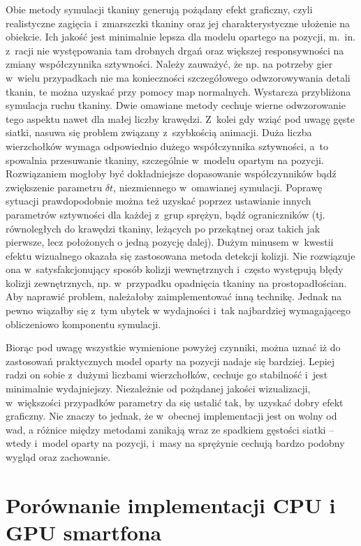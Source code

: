 	Obie metody symulacji tkaniny generują pożądany efekt graficzny, czyli realistyczne zagięcia i~zmarszczki tkaniny oraz jej charakterystyczne ułożenie na obiekcie. Ich jakość jest minimalnie lepsza dla modelu opartego na pozycji, m.~in. z~racji nie występowania tam drobnych drgań oraz większej responsywności na zmiany współczynnika sztywności. Należy zauważyć, że np. na potrzeby gier w~wielu przypadkach nie ma konieczności szczegółowego odwzorowywania detali tkanin, te można uzyskać przy pomocy map normalnych. Wystarcza przybliżona symulacja ruchu tkaniny. Dwie omawiane metody cechuje wierne odwzorowanie tego aspektu nawet dla małej liczby krawędzi. Z~kolei gdy wziąć pod uwagę gęste siatki, nasuwa się problem związany z~szybkością animacji. Duża liczba wierzchołków wymaga odpowiednio dużego współczynnika sztywności, a~to spowalnia przesuwanie tkaniny, szczególnie w~modelu opartym na pozycji. Rozwiązaniem mogłoby być dokładniejsze dopasowanie współczynników bądź zwiększenie parametru \( \delta t \), niezmiennego w~omawianej symulacji. Poprawę sytuacji prawdopodobnie można też uzyskać poprzez ustawianie innych parametrów sztywności dla każdej z~grup sprężyn, bądź ograniczników (tj. równoległych do krawędzi tkaniny, leżących po przekątnej oraz takich jak pierwsze, lecz położonych o jedną pozycję dalej). Dużym minusem w~kwestii efektu wizualnego okazała się zastosowana metoda detekcji kolizji. Nie rozwiązuje ona w~satysfakcjonujący sposób kolizji wewnętrznych i~często występują błędy kolizji zewnętrznych, np. w~przypadku opadnięcia tkaniny na prostopadłościan. Aby naprawić problem, należałoby zaimplementować inną technikę. Jednak na pewno wiązałby się z~tym ubytek w wydajności i~tak najbardziej wymagającego obliczeniowo komponentu symulacji.
	
	Biorąc pod uwagę wszystkie wymienione powyżej czynniki, można uznać iż do zastosowań praktycznych model oparty na pozycji nadaje się bardziej. Lepiej radzi on sobie z~dużymi liczbami wierzchołków, cechuje go stabilność i~jest minimalnie wydajniejszy. Niezależnie od pożądanej jakości wizualizacji, w~większości przypadków parametry da się ustalić tak, by uzyskać dobry efekt graficzny. Nie znaczy to jednak, że w~obecnej implementacji jest on wolny od wad, a różnice między metodami zanikają wraz ze spadkiem gęstości siatki -- wtedy i~model oparty na pozycji, i~masy na sprężynie cechują bardzo podobny wygląd oraz zachowanie.
	
	\section{Porównanie implementacji CPU i GPU smartfona}
	\label{t:wnioski:cpu_vs_gpu}
	
